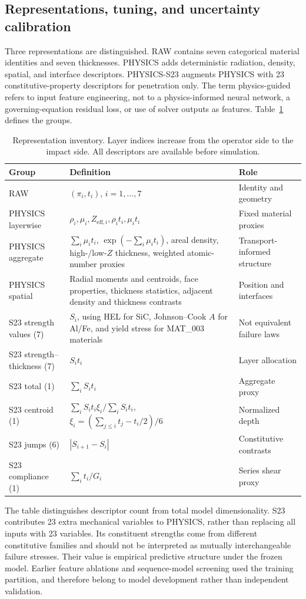 \subsection{Representations, tuning, and uncertainty calibration}
Three representations are distinguished. RAW contains seven categorical material identities and seven thicknesses. PHYSICS adds deterministic radiation, density, spatial, and interface descriptors. PHYSICS-S23 augments PHYSICS with 23 constitutive-property descriptors for penetration only. The term physics-guided refers to input feature engineering, not to a physics-informed neural network, a governing-equation residual loss, or use of solver outputs as features. Table~\ref{tab:features} defines the groups.
\begin{table}[htbp]\centering\small
\caption{Representation inventory. Layer indices increase from the operator side to the impact side. All descriptors are available before simulation.}\label{tab:features}
\begin{tabular}{@{}p{.24\linewidth}p{.47\linewidth}p{.21\linewidth}@{}}\toprule
Group & Definition & Role\\\midrule
RAW & $(\pi_i,t_i)$, $i=1,\ldots,7$ & Identity and geometry\\
PHYSICS layerwise & $\rho_i,\mu_i,Z_{\mathrm{eff},i},\rho_it_i,\mu_it_i$ & Fixed material proxies\\
PHYSICS aggregate & $\sum_i\mu_it_i$, $\exp(-\sum_i\mu_it_i)$, areal density, high-/low-$Z$ thickness, weighted atomic-number proxies & Transport-informed structure\\
PHYSICS spatial & Radial moments and centroids, face properties, thickness statistics, adjacent density and thickness contrasts & Position and interfaces\\
S23 strength values (7) & $S_i$, using HEL for SiC, Johnson--Cook $A$ for Al/Fe, and yield stress for MAT\_003 materials & Not equivalent failure laws\\
S23 strength--thickness (7) & $S_it_i$ & Layer allocation\\
S23 total (1) & $\sum_i S_it_i$ & Aggregate proxy\\
S23 centroid (1) & $\sum_i S_it_i\xi_i/\sum_i S_it_i$, $\xi_i=(\sum_{j\leq i}t_j-t_i/2)/6$ & Normalized depth\\
S23 jumps (6) & $|S_{i+1}-S_i|$ & Constitutive contrasts\\
S23 compliance (1) & $\sum_i t_i/G_i$ & Series shear proxy\\\bottomrule
\end{tabular}\end{table}
The table distinguishes descriptor count from total model dimensionality. S23 contributes 23 extra mechanical variables to PHYSICS, rather than replacing all inputs with 23 variables. Its constituent strengths come from different constitutive families and should not be interpreted as mutually interchangeable failure stresses. Their value is empirical predictive structure under the frozen model. Earlier feature ablations and sequence-model screening used the training partition, and therefore belong to model development rather than independent validation.

